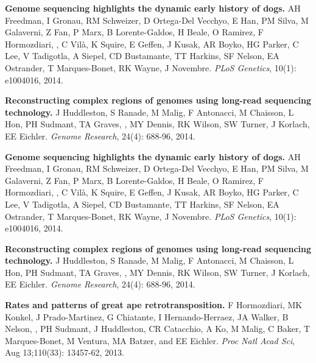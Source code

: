 \vspace{-.2cm}
    {\bf Genome sequencing highlights the dynamic early history of dogs.}
    AH Freedman, I Gronau, RM Schweizer, D Ortega-Del Vecchyo, E Han, PM Silva, M Galaverni, Z Fan, P Marx, B Lorente-Galdos, H Beale, O Ramirez, F Hormozdiari, \calkan{}, C Vilà, K Squire, E Geffen, J Kusak, AR Boyko, HG Parker, C Lee, V Tadigotla, A Siepel, CD Bustamante, TT Harkins, SF Nelson, EA Ostrander, T Marques-Bonet, RK Wayne, J Novembre.
    {\em PLoS Genetics}, 10(1): e1004016, 2014.

\vspace{-.2cm}
    {\bf Reconstructing complex regions of genomes using long-read sequencing technology.}
    J Huddleston, S Ranade, M Malig, F Antonacci, M Chaisson, L Hon, PH Sudmant, TA Graves, \calkan{}, MY Dennis, RK Wilson, SW Turner, J Korlach, EE Eichler.
    {\em Genome Research}, 24(4): 688-96, 2014.

\vspace{-.2cm}
    {\bf Genome sequencing highlights the dynamic early history of dogs.}
    AH Freedman, I Gronau, RM Schweizer, D Ortega-Del Vecchyo, E Han, PM Silva, M Galaverni, Z Fan, P Marx, B Lorente-Galdos, H Beale, O Ramirez, F Hormozdiari, \calkan{}, C Vilà, K Squire, E Geffen, J Kusak, AR Boyko, HG Parker, C Lee, V Tadigotla, A Siepel, CD Bustamante, TT Harkins, SF Nelson, EA Ostrander, T Marques-Bonet, RK Wayne, J Novembre.
    {\em PLoS Genetics}, 10(1): e1004016, 2014.

\vspace{-.2cm}
    {\bf Reconstructing complex regions of genomes using long-read sequencing technology.}
    J Huddleston, S Ranade, M Malig, F Antonacci, M Chaisson, L Hon, PH Sudmant, TA Graves, \calkan{}, MY Dennis, RK Wilson, SW Turner, J Korlach, EE Eichler.
    {\em Genome Research}, 24(4): 688-96, 2014.

\vspace{-.2cm}
    {\bf Rates and patterns of great ape retrotransposition.}
    F Hormozdiari, MK Konkel, J Prado-Martinez, G Chiatante, I Hernando-Herraez, JA Walker, B Nelson, \calkan{}, PH Sudmant, J Huddleston, CR Catacchio, A Ko, M Malig, C Baker, T Marques-Bonet, M Ventura, MA Batzer, and EE Eichler.
    {\em Proc Natl Acad Sci}, Aug 13;110(33): 13457-62, 2013.



